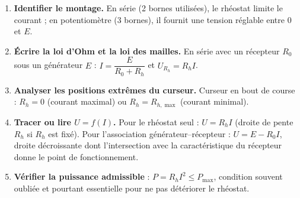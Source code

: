\documentclass[11pt]{article}
\begin{document}
\begin{methode}
\begin{enumerate}
\item \textbf{Identifier le montage.} En série (2 bornes utilisées), le rhéostat limite le courant ; en potentiomètre (3 bornes), il fournit une tension réglable entre $0$ et $E$.
\item \textbf{Écrire la loi d'Ohm et la loi des mailles.} En série avec un récepteur $R_0$ sous un générateur $E$ : $I = \dfrac{E}{R_0 + R_h}$ et $U_{R_h} = R_h I$.
\item \textbf{Analyser les positions extrêmes du curseur.} Curseur en bout de course : $R_h = 0$ (courant maximal) ou $R_h = R_{h,\max}$ (courant minimal).
\item \textbf{Tracer ou lire $U = f(I)$.} Pour le rhéostat seul : $U = R_h I$ (droite de pente $R_h$ si $R_h$ est fixé). Pour l'association générateur--récepteur : $U = E - R_0 I$, droite décroissante dont l'intersection avec la caractéristique du récepteur donne le point de fonctionnement.
\item \textbf{Vérifier la puissance admissible} : $P = R_h I^2 \leq P_{\max}$, condition souvent oubliée et pourtant essentielle pour ne pas détériorer le rhéostat.
\end{enumerate}
\end{methode}
\end{document}
